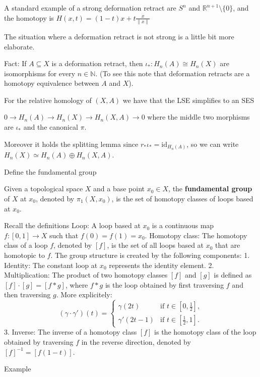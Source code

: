 A standard example of a strong deformation retract are \( S^n \) and \( \mathbb{R}^{n+1}\setminus \{0\} \),
and the homotopy is
\( H(x, t) = (1 - t)x + t\frac{x}{\|x\|} \)

The situation where a deformation retract is not strong is a little bit more elaborate.

Fact:
If \(A \subseteq X\) is a deformation retract, then \(\iota_* : H_n(A) \cong H_n(X)\) are isomorphisms for every \(n \in \mathbb{N}\).
(To see this note that deformation retracts are a homotopy equivalence between \( A \) and \( X \)).

For the relative homology of \( (X, A) \) we have that the LSE simplifies to an SES 

\( 0 \to H_n(A) \to H_n(X) \to H_n(X, A) \to 0 \)
where the middle two morphisms are \( \iota_{\ast} \) and the canonical \( \pi \).

Moreover it holds the splitting lemma since \( r_\ast \iota_\ast = \text{id}_{H_n(A)} \), so we can write
\( H_n(X) \simeq H_n(A) \oplus H_n(X, A) \).

Define the fundamental group

Given a topological space \(X\) and a base point \(x_0 \in X\), the \textbf{fundamental group} of \(X\) at \(x_0\), denoted by \(\pi_1(X, x_0)\), is the set of homotopy classes of loops based at \(x_0\).

Recall the definitions
Loop: A loop based at \(x_0\) is a continuous map \(f: [0, 1] \to X\) such that \(f(0) = f(1) = x_0\). 
Homotopy class: The homotopy class of a loop \(f\), denoted by \([f]\), is the set of all loops based at \(x_0\) that are homotopic to \(f\).
The group structure is created by the following components:
1. Identity: The constant loop at \(x_0\) represents the identity element.
2. Multiplication: The product of two homotopy classes \([f]\) and \([g]\) is defined as \([f] \cdot [g] = [f * g]\), where \(f * g\) is the loop obtained by 
first traversing \(f\) and then traversing \(g\).
More explicitely:
\[
    (\gamma \cdot \gamma')(t) = \begin{cases}
    \gamma(2t) & \text{if } t \in [0, \frac{1}{2}], \\
    \gamma'(2t - 1) & \text{if } t \in [\frac{1}{2}, 1].
    \end{cases}
\]
3. Inverse: The inverse of a homotopy class \([f]\) is the homotopy class of the loop obtained by traversing \(f\) in the reverse direction, denoted by \([f]^{-1} = [f(1-t)]\).

Example

